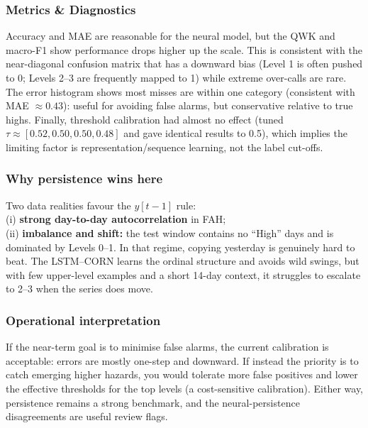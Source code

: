 \documentclass[
  letterpaper,
  DIV=11,
  numbers=noendperiod]{scrartcl}
\begin{document}
\subsubsection{Metrics \& Diagnostics}\label{metrics-diagnostics}

Accuracy and MAE are reasonable for the neural model, but the QWK and
macro-F1 show performance drops higher up the scale. This is consistent
with the near-diagonal confusion matrix that has a downward bias (Level
1 is often pushed to 0; Levels 2--3 are frequently mapped to 1) while
extreme over-calls are rare. The error histogram shows most misses are
within one category (consistent with MAE \(\approx 0.43\)): useful for
avoiding false alarms, but conservative relative to true highs. Finally,
threshold calibration had almost no effect (tuned
\(\tau \approx [0.52, 0.50, 0.50, 0.48]\) and gave identical results to
0.5), which implies the limiting factor is representation/sequence
learning, not the label cut-offs.

\subsubsection{Why persistence wins
here}\label{why-persistence-wins-here}

Two data realities favour the \(y[t-1]\) rule:\\
(i) \textbf{strong day-to-day autocorrelation} in FAH;\\
(ii) \textbf{imbalance and shift:} the test window contains no ``High''
days and is dominated by Levels 0--1. In that regime, copying yesterday
is genuinely hard to beat. The LSTM--CORN learns the ordinal structure
and avoids wild swings, but with few upper-level examples and a short
14-day context, it struggles to escalate to 2--3 when the series does
move.

\subsubsection{Operational
interpretation}\label{operational-interpretation}

If the near-term goal is to minimise false alarms, the current
calibration is acceptable: errors are mostly one-step and downward. If
instead the priority is to catch emerging higher hazards, you would
tolerate more false positives and lower the effective thresholds for the
top levels (a cost-sensitive calibration). Either way, persistence
remains a strong benchmark, and the neural-persistence disagreements are
useful review flags.
\end{document}
